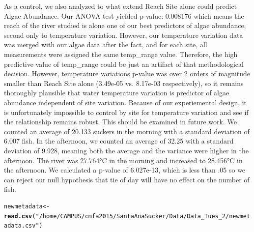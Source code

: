 \documentclass{article}\usepackage[]{graphicx}\usepackage[]{color}
\makeatletter
\newcommand{\hlstr}[1]{\textcolor[rgb]{0.192,0.494,0.8}{#1}}%
\newcommand{\hlstd}[1]{\textcolor[rgb]{0.345,0.345,0.345}{#1}}%
\newcommand{\hlkwb}[1]{\textcolor[rgb]{0.69,0.353,0.396}{#1}}%
\newcommand{\hlkwd}[1]{\textcolor[rgb]{0.737,0.353,0.396}{\textbf{#1}}}%
\newenvironment{kframe}{%
 \def\at@end@of@kframe{}%
 \ifinner\ifhmode%
  \def\at@end@of@kframe{\end{minipage}}%
  \begin{minipage}{\columnwidth}%
 \fi\fi%
 \def\FrameCommand##1{\hskip\@totalleftmargin \hskip-\fboxsep
 \colorbox{shadecolor}{##1}\hskip-\fboxsep
     \hskip-\linewidth \hskip-\@totalleftmargin \hskip\columnwidth}%
 \MakeFramed {\advance\hsize-\width
   \@totalleftmargin\z@ \linewidth\hsize
   \@setminipage}}%
 {\par\unskip\endMakeFramed%
 \at@end@of@kframe}
\newenvironment{knitrout}{}{} %
\makeatother
\begin{document}
As a control, we also analyzed to what extend Reach Site alone could predict Algae Abundance. Our ANOVA test yielded p-value: 0.008176 which means the reach of the river studied is alone one of our best predictors of algae abundance, second only to temperature variation. However, our temperature variation data was merged with our algae data after the fact, and for each site, all measurements were assigned the same temp\_range value. Therefore, the high predictive value of temp\_range could be just an artifact of that methodological decision. However, temperature variations p-value was over 2 orders of magnitude smaller than Reach Site alone (3.49e-05 vs. 8.17e-03 respectively), so it remains thoroughly plausible that water temperature variation is predictor of algae abundance independent of site variation. Because of our experiemental design, it is unfortunately impossible to control by site for temperature variation and see if the relationship remains robust. This should be examined in future work. We counted an average of 20.133 suckers in the morning with a standard deviation of 6.007 fish.  In the afternoon, we counted an average of 32.25 with a standard deviation of 9.928, meaning both the average and the variance were higher in the afternoon.  The river was 27.764°C in the morning and increased to 28.456°C in the afternoon.  We calculated a p-value of 6.027e-13, which is less than .05 so we can reject our null hypothesis that tie of day will have no effect on the number of fish.
\begin{knitrout}
\color{fgcolor}\begin{kframe}
\begin{alltt}
\hlstd{newmetadata} \hlkwb{<-} \hlkwd{read.csv}\hlstd{(}\hlstr{"/home/CAMPUS/cmfa2015/Santa Ana Sucker/Data/Data_Tues_2/newmetadata.csv"}\hlstd{)}
\end{alltt}
\end{kframe}
\end{knitrout}
\end{document}
